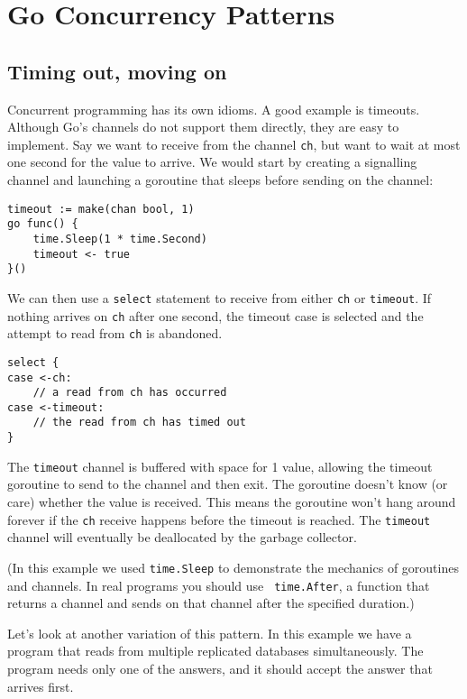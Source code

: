 \cleardoublepage
{}
{}
\chapter*{Go Concurrency Patterns}
\section*{Timing out, moving on}

Concurrent programming has its own idioms. A good example is timeouts.
Although Go's channels do not support them directly, they are easy to
implement. Say we want to receive from the channel \texttt{ch}, but want
to wait at most one second for the value to arrive. We would start by
creating a signalling channel and launching a goroutine that sleeps
before sending on the channel:

\begin{Verbatim}[frame=single]
timeout := make(chan bool, 1)
go func() {
	time.Sleep(1 * time.Second)
	timeout <- true
}()
\end{Verbatim}

We can then use a \texttt{select} statement to receive from either
\texttt{ch} or \texttt{timeout}. If nothing arrives on \texttt{ch} after
one second, the timeout case is selected and the attempt to read from
\texttt{ch} is abandoned.

\begin{Verbatim}[frame=single]
select {
case <-ch:
	// a read from ch has occurred
case <-timeout:
	// the read from ch has timed out
}
\end{Verbatim}

The \texttt{timeout} channel is buffered with space for 1 value,
allowing the timeout goroutine to send to the channel and then exit. The
goroutine doesn't know (or care) whether the value is received. This
means the goroutine won't hang around forever if the \texttt{ch} receive
happens before the timeout is reached. The \texttt{timeout} channel will
eventually be deallocated by the garbage collector.

(In this example we used \texttt{time.Sleep} to demonstrate the
mechanics of goroutines and channels. In real programs you should use
\texttt{ time.After}, a function that returns a channel and sends on
that channel after the specified duration.)

Let's look at another variation of this pattern. In this example we have
a program that reads from multiple replicated databases simultaneously.
The program needs only one of the answers, and it should accept the
answer that arrives first.

